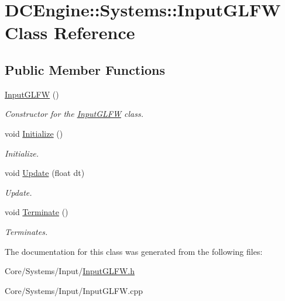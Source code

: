 \hypertarget{classDCEngine_1_1Systems_1_1InputGLFW}{\section{D\-C\-Engine\-:\-:Systems\-:\-:Input\-G\-L\-F\-W Class Reference}
\label{classDCEngine_1_1Systems_1_1InputGLFW}
}
\subsection*{Public Member Functions}
\begin{DoxyCompactItemize}
\item 
\hypertarget{classDCEngine_1_1Systems_1_1InputGLFW_a1b7037f3b79aa3b90dd46b22941309c8}{\hyperlink{classDCEngine_1_1Systems_1_1InputGLFW_a1b7037f3b79aa3b90dd46b22941309c8}{Input\-G\-L\-F\-W} ()}\label{classDCEngine_1_1Systems_1_1InputGLFW_a1b7037f3b79aa3b90dd46b22941309c8}

\begin{DoxyCompactList}\small\item\em Constructor for the \hyperlink{classDCEngine_1_1Systems_1_1InputGLFW}{Input\-G\-L\-F\-W} class. \end{DoxyCompactList}\item 
\hypertarget{classDCEngine_1_1Systems_1_1InputGLFW_a2dc4d736f9b73ff5c2f3c037c06accd3}{void \hyperlink{classDCEngine_1_1Systems_1_1InputGLFW_a2dc4d736f9b73ff5c2f3c037c06accd3}{Initialize} ()}\label{classDCEngine_1_1Systems_1_1InputGLFW_a2dc4d736f9b73ff5c2f3c037c06accd3}

\begin{DoxyCompactList}\small\item\em Initialize. \end{DoxyCompactList}\item 
\hypertarget{classDCEngine_1_1Systems_1_1InputGLFW_ae5cbfea6c320466616243aa768308946}{void \hyperlink{classDCEngine_1_1Systems_1_1InputGLFW_ae5cbfea6c320466616243aa768308946}{Update} (float dt)}\label{classDCEngine_1_1Systems_1_1InputGLFW_ae5cbfea6c320466616243aa768308946}

\begin{DoxyCompactList}\small\item\em Update. \end{DoxyCompactList}\item 
\hypertarget{classDCEngine_1_1Systems_1_1InputGLFW_ad303dc21f8270103fc76b60b2ab72459}{void \hyperlink{classDCEngine_1_1Systems_1_1InputGLFW_ad303dc21f8270103fc76b60b2ab72459}{Terminate} ()}\label{classDCEngine_1_1Systems_1_1InputGLFW_ad303dc21f8270103fc76b60b2ab72459}

\begin{DoxyCompactList}\small\item\em Terminates. \end{DoxyCompactList}\end{DoxyCompactItemize}


The documentation for this class was generated from the following files\-:\begin{DoxyCompactItemize}
\item 
Core/\-Systems/\-Input/\hyperlink{InputGLFW_8h}{Input\-G\-L\-F\-W.\-h}\item 
Core/\-Systems/\-Input/Input\-G\-L\-F\-W.\-cpp\end{DoxyCompactItemize}
